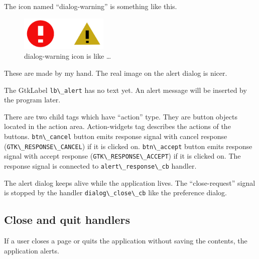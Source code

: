 The icon named ``dialog-warning'' is something like this.

\begin{figure}
\centering
\includegraphics[width=4.19cm,height=1.62cm]{../image/dialog_warning.png}
\caption{dialog-warning icon is like \ldots{}}
\end{figure}

These are made by my hand. The real image on the alert dialog is nicer.

The GtkLabel \passthrough{\lstinline!lb\_alert!} has no text yet. An
alert message will be inserted by the program later.

There are two child tags which have ``action'' type. They are button
objects located in the action area. Action-widgets tag describes the
actions of the buttons. \passthrough{\lstinline!btn\_cancel!} button
emits response signal with cancel response
(\passthrough{\lstinline!GTK\_RESPONSE\_CANCEL!}) if it is clicked on.
\passthrough{\lstinline!btn\_accept!} button emits response signal with
accept response (\passthrough{\lstinline!GTK\_RESPONSE\_ACCEPT!}) if it
is clicked on. The response signal is connected to
\passthrough{\lstinline!alert\_response\_cb!} handler.

The alert dialog keeps alive while the application lives. The
``close-request'' signal is stopped by the handler
\passthrough{\lstinline!dialog\_close\_cb!} like the preference dialog.

\hypertarget{close-and-quit-handlers}{%
\subsection{Close and quit handlers}\label{close-and-quit-handlers}}

If a user closes a page or quits the application without saving the
contents, the application alerts.


